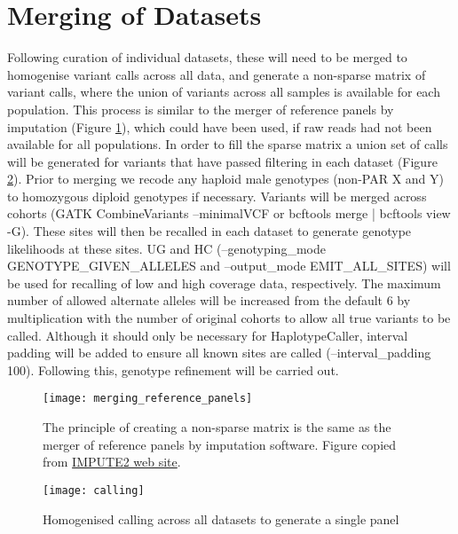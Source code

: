 \section{Merging of Datasets}
Following curation of individual datasets, these will need to be merged to homogenise variant calls across all data, and generate a non-sparse matrix of variant calls, where the union of variants across all samples is available for each population. This process is similar to the merger of reference panels by imputation (Figure \ref{fig:merging_reference_panels}), which could have been used, if raw reads had not been available for all populations. In order to fill the sparse matrix a union set of calls will be generated for variants that have passed filtering in each dataset (Figure \ref{fig:calling}). Prior to merging we recode any haploid male genotypes (non-PAR X and Y) to homozygous diploid genotypes if necessary. %
Variants will be merged across cohorts (GATK CombineVariants --minimalVCF or bcftools merge | bcftools view -G). These sites will then be recalled in each dataset to generate genotype likelihoods at these sites.
UG and HC (--genotyping\_mode GENOTYPE\_GIVEN\_ALLELES and --output\_mode EMIT\_ALL\_SITES) will be used for recalling of low and high coverage data, respectively.
The maximum number of allowed alternate alleles will be increased from the default 6 by multiplication with the number of original cohorts to allow all true variants to be called. Although it should only be necessary for HaplotypeCaller, interval padding will be added to ensure all known sites are called (--interval\_padding 100).
Following this, genotype refinement will be carried out.

\begin{figure}[h]
\centering
\texttt{[image: merging\_reference\_panels]}
\caption{The principle of creating a non-sparse matrix is the same as the merger of reference panels by imputation software. Figure copied from \href{http://mathgen.stats.ox.ac.uk/impute/merging\_reference\_panels.png}{IMPUTE2 web site}.}
\label{fig:merging_reference_panels}
\end{figure}

\begin{figure}[h]
\centering
\texttt{[image: calling]}
\caption{Homogenised calling across all datasets to generate a single panel}
\label{fig:calling}
\end{figure}
